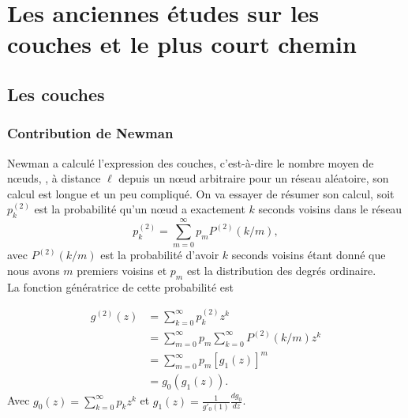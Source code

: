 \section{Les anciennes études sur les couches et le plus court chemin}
\subsection{Les couches}
\subsubsection{Contribution de Newman}
Newman \cite{Newman2010-456} a calculé l'expression des couches, c'est-à-dire le nombre moyen de nœuds, \nl, à distance $\ell$ depuis un nœud arbitraire pour un réseau aléatoire, son calcul est longue et un peu compliqué. On va essayer de résumer son calcul, soit $p_k^{(2)}$ est la probabilité qu'un nœud a exactement $k$ seconds voisins dans le réseau
\begin{equation}
p_k^{(2)}=\sum_{m=0}^{\infty}p_mP^{(2)}(k/m),
\end{equation}
avec $P^{(2)}(k/m)$ est la probabilité d'avoir $k$ seconds voisins étant donné que nous avons $m$ premiers voisins et $p_m$ est la distribution des degrés ordinaire.\\
La fonction génératrice de cette probabilité est 

\begin{align}
	g^{(2)}(z)&=\sum_{k=0}^{\infty}p_k^{(2)}z^{k}\nonumber\\
	&=\sum_{m=0}^{\infty}p_m\sum_{k=0}^{\infty}P^{(2)}(k/m)z^k\nonumber\\
	&=\sum_{m=0}^{\infty}p_m[g_1(z)]^m\nonumber\\
	&=g_0(g_1(z)).
	\label{p-generatrice-2}
\end{align}
Avec $g_0(z)=\sum_{k=0}^{\infty}p_kz^k$ et $g_1(z)=\frac{1}{g'_0(1)}\frac{dg_0}{dz}$.\\

